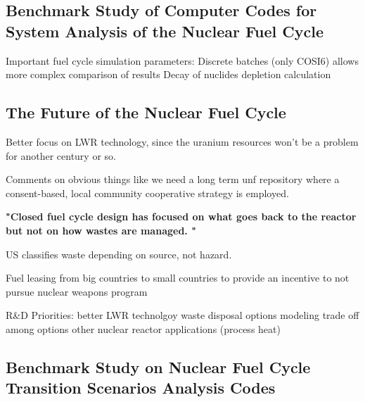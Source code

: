 \subsection{Benchmark Study of Computer Codes for System Analysis of the Nuclear Fuel Cycle}
\cite{benchmark_laurent_2009}

Important fuel cycle simulation parameters:
Discrete batches (only COSI6) allows more complex comparison of results
Decay of nuclides
depletion calculation


\subsection{The Future of the Nuclear Fuel Cycle}
\cite{MITEI}

Better focus on LWR technology, since the uranium resources
won't be a problem for another century or so.

Comments on obvious things like we need a long term unf repository
where a consent-based, local community cooperative strategy is employed.

\textbf{"Closed fuel cycle design has focused on what goes back to the reactor but not on how wastes are managed. "}

US classifies waste depending on source, not hazard.

Fuel leasing from big countries to small countries
to provide an incentive to not pursue nuclear weapons program

R\&D Priorities:
better LWR technolgoy
waste disposal options
modeling trade off among options
other nuclear reactor applications (process heat)

\subsection{Benchmark Study on Nuclear Fuel Cycle Transition Scenarios Analysis Codes}

